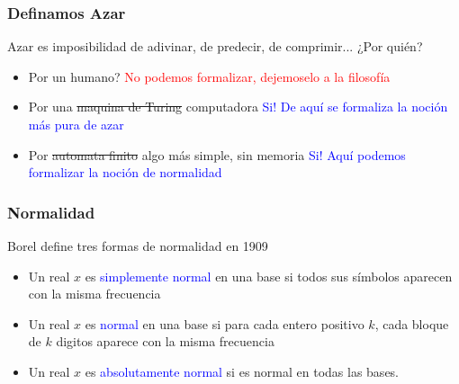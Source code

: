 \begin{frame}
\frametitle{Definamos Azar}
\medskip
Azar es imposibilidad de adivinar, de predecir, de comprimir...
¿Por quién?\\
\begin{itemize}
	\item Por un humano? \pause \textcolor{red}{No podemos formalizar, dejemoselo a la filosofía}
	\pause
	\item Por una \st{maquina de Turing} computadora \pause \textcolor{blue}{Si! De aquí se formaliza la noción más pura de azar}
	\pause
	\item Por \st{automata finito} algo más simple, sin memoria \pause \textcolor{blue}{Si! Aquí podemos formalizar la noción de normalidad}
\end{itemize}
\end{frame}

\begin{frame}
\frametitle{Normalidad}
\medskip
Borel define tres formas de normalidad en 1909
\begin{itemize}
	\item Un real $x$ es \textcolor{blue}{simplemente normal} en una base si todos sus símbolos aparecen con la misma frecuencia
	\pause
	\item Un real $x$ es \textcolor{blue}{normal} en una base si para cada entero positivo $k$, cada bloque de $k$ digitos aparece con la misma frecuencia
	\pause
	\item Un real $x$ es \textcolor{blue}{absolutamente normal} si es normal en todas las bases.
\end{itemize}
\pause
{}
\end{frame}


